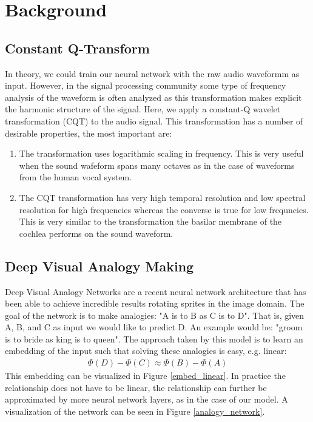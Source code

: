\documentclass{article}
\begin{document}
\section{Background}
\subsection{Constant Q-Transform}
    In theory, we could train our neural network with the raw audio waveformm as input. However, in the signal processing community some type of frequency analysis of the waveform is often analyzed as this transformation makes explicit the harmonic structure of the signal. Here, we apply a constant-Q wavelet transformation (CQT) to the audio signal. This transformation has a number of desirable properties, the most important are:
\begin{enumerate}
\item The transformation uses logarithmic scaling in frequency. This is very useful when the sound wafeform spans many octaves as in the case of waveforms from the human vocal system.
\item The CQT transformation has very high temporal resolution and low spectral resolution for high frequencies whereas the converse is true for low frequncies. This is very similar to the transformation the basilar membrane of the cochlea performs on the sound waveform.
\end{enumerate}

\subsection{Deep Visual Analogy Making}
    Deep Visual Analogy Networks \cite{reed2015deep} are a recent neural network architecture that has been able to achieve incredible results rotating sprites in the image domain. The goal of the network is to make analogies: "A is to B as C is to D". That is, given A, B, and C as input we would like to predict D. An example would be: "groom is to bride as king is to queen". The approach taken by this model is to learn an embedding of the input such that solving these analogies is easy, e.g. linear:
\begin{eqnarray*}
\Phi(D) - \Phi(C) \approx \Phi(B) - \Phi(A)
\end{eqnarray*}
This embedding can be visualized in Figure \ref{embed_linear}. In practice the relationship does not have to be linear, the relationship can further be approximated by more neural network layers, as in the case of our model. A visualization of the network can be seen in Figure \ref{analogy_network}.
\end{document}
